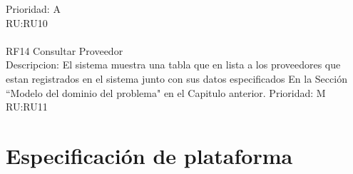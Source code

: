 Prioridad: A\\
RU:RU10\\
\\
RF14 Consultar Proveedor\\
Descripcion: El sistema muestra una tabla que en lista a los proveedores que estan registrados en el sistema junto con sus datos especificados En la Sección ``Modelo del dominio del problema" en el  Capitulo anterior.
Prioridad: M\\
RU:RU11\\
\newpage

\section{Especificación de plataforma}	


